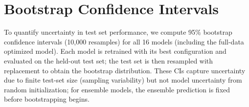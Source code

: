 \documentclass[12pt]{article}
\begin{document}
\section{Bootstrap Confidence Intervals}
\label{app:bootstrap}

To quantify uncertainty in test set performance, we compute 95\% bootstrap confidence intervals (10{,}000 resamples) for all 16 models (including the full-data optimized model).
Each model is retrained with its best configuration and evaluated on the held-out test set; the test set is then resampled with replacement to obtain the bootstrap distribution.
These CIs capture uncertainty due to finite test-set size (sampling variability) but not model uncertainty from random initialization; for ensemble models, the ensemble prediction is fixed before bootstrapping begins.
\end{document}
